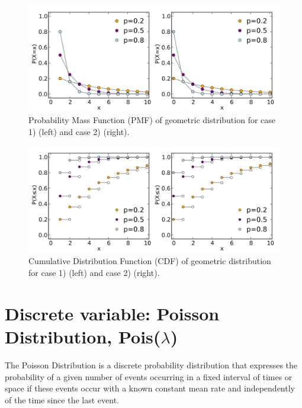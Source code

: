 \begin{figure}[h!]
\begin{center}
	\includegraphics[scale=0.09]{geometric_pmf.png}
	\caption[]{Probability Mass Function (PMF) of geometric distribution for case 1) (left) and case 2) (right).}
	\label{fairdiepmf}
	\end{center}
	\end{figure}
	
\begin{figure}[h!]
\begin{center}
	\includegraphics[scale=0.09]{geometric_cdf.png}
	\caption[]{Cumulative Distribution Function (CDF) of geometric distribution for case 1) (left) and case 2) (right).}
	\label{fairdiepmf}
	\end{center}
	\end{figure}

\section{Discrete variable: Poisson Distribution, Pois($\lambda$)}

The Poisson Distribution is a discrete probability distribution that expresses the probability of a given number of events occurring in a fixed interval of times or space if these events occur with a known constant mean rate and independently of the time since the last event. \\

